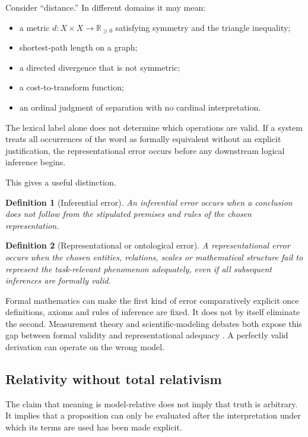 \documentclass[11pt,a4paper]{article}
\newtheorem{definition}{Definition}
\begin{document}
Consider ``distance.'' In different domains it may mean:

\begin{itemize}
    \item a metric $d:X\times X\rightarrow\mathbb{R}_{\ge 0}$ satisfying symmetry and the triangle inequality;
    \item shortest-path length on a graph;
    \item a directed divergence that is not symmetric;
    \item a cost-to-transform function;
    \item an ordinal judgment of separation with no cardinal interpretation.
\end{itemize}

The lexical label alone does not determine which operations are valid. If a system treats all occurrences of the word as formally equivalent without an explicit justification, the representational error occurs before any downstream logical inference begins.

This gives a useful distinction.

\begin{definition}[Inferential error]
An inferential error occurs when a conclusion does not follow from the stipulated premises and rules of the chosen representation.
\end{definition}

\begin{definition}[Representational or ontological error]
A representational error occurs when the chosen entities, relations, scales or mathematical structure fail to represent the task-relevant phenomenon adequately, even if all subsequent inferences are formally valid.
\end{definition}

Formal mathematics can make the first kind of error comparatively explicit once definitions, axioms and rules of inference are fixed. It does not by itself eliminate the second. Measurement theory and scientific-modeling debates both expose this gap between formal validity and representational adequacy \cite{scottSuppes1958,suarez2004}. A perfectly valid derivation can operate on the wrong model.

\subsection{Relativity without total relativism}
The claim that meaning is model-relative does not imply that truth is arbitrary. It implies that a proposition can only be evaluated after the interpretation under which its terms are used has been made explicit.
\end{document}
